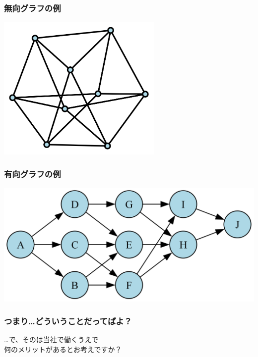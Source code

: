 \documentclass[aspectratio=169,dvipdfmx,12pt,notheorems]{beamer}
\theoremstyle{definition}
\begin{document}
\begin{frame}\frametitle{無向グラフの例}

\begin{center}
\includegraphics[width=8cm]{graph.png}
\end{center}

\end{frame}

\begin{frame}\frametitle{有向グラフの例}

\begin{center}
\includegraphics[width=15cm]{dag_example.png}
\end{center}

\end{frame}

%
%

\begin{frame}\frametitle{つまり…どういうことだってばよ？}

\begin{center}
\Huge{…で、そのは当社で働くうえで \\ 何のメリットがあるとお考えですか？}
\end{center}

\end{frame}
\end{document}
